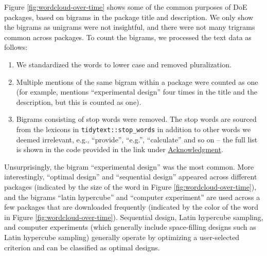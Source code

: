 Figure \ref{fig:wordcloud-over-time} shows some of the common purposes of DoE packages, based on bigrams in the package title and description. We only show the bigrams as unigrams were not insightful, and there were not many trigrams common across packages. To count the bigrams, we processed the text data as follows:

\begin{enumerate}
\def\labelenumi{\arabic{enumi}.}
\tightlist
\item
  We standardized the words to lower case and removed pluralization.
\item
  Multiple mentions of the same bigram within a package were counted as one (for example,  mentions ``experimental design'' four times in the title and the description, but this is counted as one).
\item
  Bigrams consisting of stop words were removed. The stop words are sourced from the lexicons in \texttt{tidytext::stop\_words} in addition to other words we deemed irrelevant, e.g., ``provide'', ``e.g.'', ``calculate'' and so on -- the full list is shown in the code provided in the link under \hyperref[pkgs]{Acknowledgment}.
\end{enumerate}

Unsurprisingly, the bigram ``experimental design'' was the most common. More interestingly, ``optimal design'' and ``sequential design'' appeared across different packages (indicated by the size of the word in Figure \ref{fig:wordcloud-over-time}), and the bigrams ``latin hypercube'' and ``computer experiment'' are used across a few packages that are downloaded frequently (indicated by the color of the word in Figure \ref{fig:wordcloud-over-time}). Sequential design, Latin hypercube sampling, and computer experiments (which generally include space-filling designs such as Latin hypercube sampling) generally operate by optimizing a user-selected criterion and can be classified as optimal designs.

